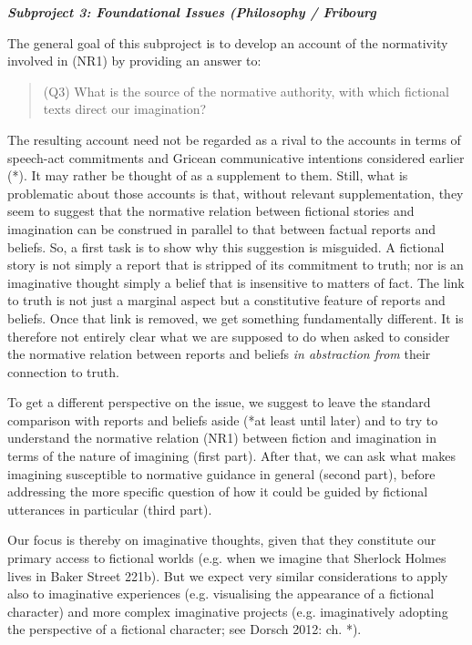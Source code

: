 \vspace{.2cm}
\noindent\textbf{\emph{Subproject 3: Foundational Issues (Philosophy / Fribourg}}
\vspace{.1cm}

The general goal of this subproject is to develop an account of the normativity involved in (NR1) by providing an answer to:

\vspace{-.2cm}
\begin{quote}
(Q3) What is the source of the normative authority, with which fictional texts direct our imagination?
\end{quote}
\vspace{-.2cm}

\noindent The resulting account need not be regarded as a rival to the accounts in terms of speech-act commitments and Gricean communicative intentions considered earlier (*). It may rather be thought of as a supplement to them. Still, what is problematic about those accounts is that, without relevant supplementation, they seem to suggest that the normative relation between fictional stories and imagination can be construed in parallel to that between factual reports and beliefs. So, a first task is to show why this suggestion is misguided. A fictional story is not simply a report that is stripped of its commitment to truth; nor is an imaginative thought simply a belief that is insensitive to matters of fact. The link to truth is not just a marginal aspect but a constitutive feature of reports and beliefs. Once that link is removed, we get something fundamentally different. It is therefore not entirely clear what we are supposed to do when asked to consider the normative relation between reports and beliefs \emph{in abstraction from} their connection to truth.

To get a different perspective on the issue, we suggest to leave the standard comparison with reports and beliefs aside (*at least until later) and to try to understand the normative relation (NR1) between fiction and imagination in terms of the nature of imagining (first part). After that, we can ask what makes imagining susceptible to normative guidance in general (second part), before addressing the more specific question of how it could be guided by fictional utterances in particular (third part).

Our focus is thereby on imaginative thoughts, given that they constitute our primary access to fictional worlds (e.g. when we imagine that Sherlock Holmes lives in Baker Street 221b). But we expect very similar considerations to apply also to imaginative experiences (e.g. visualising the appearance of a fictional character) and more complex imaginative projects (e.g. imaginatively adopting the perspective of a fictional character; see Dorsch 2012: ch. *).

